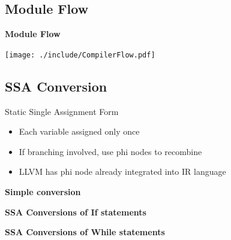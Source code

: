 \documentclass{beamer}
\begin{document}
\subsection{Module Flow}

\begin{frame}{\bf Module Flow}
  \begin{center}
    \texttt{[image: ./include/CompilerFlow.pdf]}
  \end{center}
\end{frame}

\subsection{SSA Conversion}

\begin{frame}{Static Single Assignment Form}
  \begin{itemize}
  \item<1->Each variable assigned only once
  \item<2->If branching involved, use phi nodes to recombine
  \item<3->LLVM has phi node already integrated into IR language
  \end{itemize}
\end{frame}

\begin{frame}{\bf Simple conversion}
  
\pause
  
\end{frame}

\begin{frame}[shrink]{\bf SSA Conversions of If statements}
  
\pause
  
\end{frame}

\begin{frame}[shrink]{\bf SSA Conversions of While statements}
  
\pause
  
\end{frame}
\end{document}
